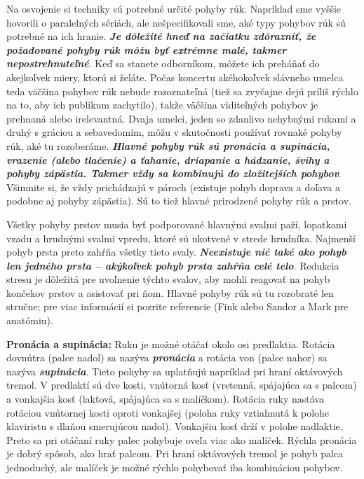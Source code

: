 \documentclass[11pt,a4paper%
]{book}
\begin{document}
Na osvojenie si techniky sú potrebné určité pohyby rúk. Napríklad sme vyššie hovorili o paralelných sériách, ale nešpecifikovali sme, aké typy pohybov rúk sú potrebné na ich hranie. \emph{\textbf{Je dôležité hneď na začiatku zdôrazniť, že požadované pohyby rúk môžu byť extrémne malé, takmer nepostrehnuteľné}}. Keď sa stanete odborníkom, môžete ich preháňať do akejkoľvek miery, ktorú si želáte. Počas koncertu akéhokoľvek slávneho umelca teda väčšina pohybov rúk nebude rozoznateľná (tiež sa zvyčajne dejú príliš rýchlo na to, aby ich publikum zachytilo), takže väčšina viditeľných pohybov je prehnaná alebo irelevantná. Dvaja umelci, jeden so zdanlivo nehybnými rukami a druhý s gráciou a sebavedomím, môžu v skutočnosti používať rovnaké pohyby rúk, aké tu rozoberáme. \emph{\textbf{Hlavné pohyby rúk sú pronácia a supinácia, vrazenie (alebo tlačenie) a ťahanie, driapanie a hádzanie, švihy a pohyby zápästia. Takmer vždy sa kombinujú do zložitejších pohybov}}. Všimnite si, že vždy prichádzajú v pároch (existuje pohyb doprava a doľava a podobne aj pohyby zápästia). Sú to tiež hlavné prirodzené pohyby rúk a prstov.

Všetky pohyby prstov musia byť podporované hlavnými svalmi paží, lopatkami vzadu a hrudnými svalmi vpredu, ktoré sú ukotvené v strede hrudníka. Najmenší pohyb prsta preto zahŕňa všetky tieto svaly. \emph{\textbf{Neexistuje nič také ako pohyb len jedného prsta -- akýkoľvek pohyb prsta zahŕňa celé telo}}. Redukcia stresu je dôležitá pre uvoľnenie týchto svalov, aby mohli reagovať na pohyb končekov prstov a asistovať pri ňom. Hlavné pohyby rúk sú tu rozobraté len stručne; pre viac informácií si pozrite referencie (Fink alebo Sandor a Mark pre anatómiu).

\textbf{Pronácia a supinácia:} Ruku je možné otáčať okolo osi predlaktia. Rotácia dovnútra (palce nadol) sa nazýva \emph{\textbf{pronácia}} a rotácia von (palce nahor) sa nazýva \emph{\textbf{supinácia}}. Tieto pohyby sa uplatňujú napríklad pri hraní oktávových tremol. V predlaktí sú dve kosti, vnútorná kosť (vretenná, spájajúca sa s palcom) a vonkajšia kosť (lakťová, spájajúca sa s malíčkom). Rotácia ruky nastáva rotáciou vnútornej kosti oproti vonkajšej (poloha ruky vztiahnutá k polohe klaviristu s dlaňou smerujúcou nadol). Vonkajšiu kosť drží v polohe nadlaktie. Preto sa pri otáčaní ruky palec pohybuje oveľa viac ako malíček. Rýchla pronácia je dobrý spôsob, ako hrať palcom. Pri hraní oktávových tremol je pohyb palca jednoduchý, ale malíček je možné rýchlo pohybovať iba kombináciou pohybov.
\end{document}
